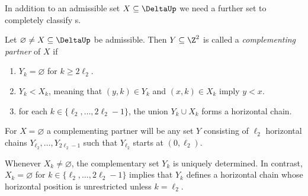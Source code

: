 In addition to an admissible set
$X\subseteq \DeltaUp$ we need 
a further set to completely 
classify {\mes}s.

\begin{defi}
\label{def:SuppPartnerPC}
Let $\varnothing\not=X\subseteq\DeltaUp$ 
be admissible. Then $Y\subseteq\Z^2$ 
is called a {\em complementing partner} 
of $X$ if
\begin{enumerate}
\item[(Cv)]
$Y_k=\varnothing$ for $k\geq 2\ell_2$.
\vspace{1ex}
\item[(Cvi)]
$Y_k<X_k$, meaning that $(y,k)\in Y_k$ 
and $(x,k)\in X_k$ imply $y<x$.
\vspace{1ex}
\item[(Cvii)]
for each $k\in\{\ell_2,\ldots,2\ell_2-1\}$, 
the union $Y_k\cup X_k$ forms a horizontal 
chain.
\end{enumerate}

For $X=\varnothing$ a complementing partner 
will be any set $Y$ consisting of $\ell_2$ 
horizontal chains $Y_{\ell_2},\ldots,
Y_{2\ell_2-1}$ such that $Y_{\ell_2}$ 
starts at $(0,\ell_2)$.
\end{defi}

\begin{rema}
Whenever $X_k\neq\varnothing$, the 
complementary set $Y_k$ is uniquely 
determined. In contrast, $X_k=\varnothing$ 
for $k\in\{\ell_2,\ldots,2\ell_2-1\}$ 
implies that $Y_k$ defines a horizontal 
chain whose horizontal position is 
unrestricted unless $k=\ell_2$.
\end{rema}

